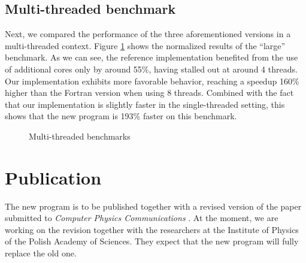 \subsection{Multi-threaded benchmark}

Next, we compared the performance of the three aforementioned versions in a multi-threaded context. Figure \ref{f:bench_multi} shows the normalized results of the ``large'' benchmark. As we can see, the reference implementation benefited from the use of additional cores only by around 55\%, having stalled out at around 4 threads. Our implementation exhibits more favorable behavior, reaching a speedup 160\% higher than the Fortran version when using 8 threads. Combined with the fact that our implementation is slightly faster in the single-threaded setting, this shows that the new program is 193\% faster on this benchmark.

\begin{figure}[ht]
\centering
{}

\caption{Multi-threaded benchmarks}
\label{f:bench_multi}
\end{figure}

\section{Publication}

The new program is to be published together with a revised version of the paper submitted to \textit{Computer Physics Communications} \cite{CPC14}. At the moment, we are working on the revision together with the researchers at the Institute of Physics of the Polish Academy of Sciences. They expect that the new program will fully replace the old one.
